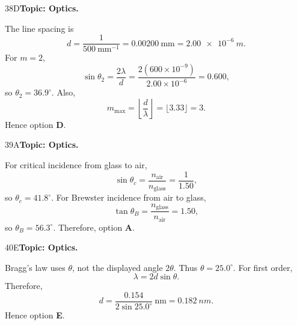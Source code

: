 \documentclass[10pt,a4paper]{physicsquiz}
\begin{document}
\begin{workedsolution}{38}{D}\textbf{Topic: Optics.}\par The line spacing is
  \[
    d=\frac{1}{500\ \mathrm{mm}^{-1}}=0.00200\ \mathrm{mm}=\SI{2.00e-6}{m}.
  \]
  For \(m=2\),
  \[
    \sin\theta_2=\frac{2\lambda}{d}
    =\frac{2(600\times10^{-9})}{2.00\times10^{-6}}=0.600,
  \]
  so \(\theta_2=36.9^\circ\). Also,
  \[
    m_{\max}=\left\lfloor\frac{d}{\lambda}\right\rfloor
    =\lfloor3.33\rfloor=3.
  \]
  Hence option \textbf{D}.\end{workedsolution}
\begin{workedsolution}{39}{A}\textbf{Topic: Optics.}\par For critical incidence from glass to air,
  \[
    \sin\theta_c=\frac{n_{\text{air}}}{n_{\text{glass}}}=\frac{1}{1.50},
  \]
  so \(\theta_c=41.8^\circ\). For Brewster incidence from air to glass,
  \[
    \tan\theta_B=\frac{n_{\text{glass}}}{n_{\text{air}}}=1.50,
  \]
  so \(\theta_B=56.3^\circ\). Therefore, option \textbf{A}.\end{workedsolution}
\begin{workedsolution}{40}{E}\textbf{Topic: Optics.}\par Bragg's law uses \(\theta\), not the displayed angle \(2\theta\). Thus \(\theta=25.0^\circ\). For first order,
  \[
    \lambda=2d\sin\theta.
  \]
  Therefore,
  \[
    d=\frac{0.154}{2\sin25.0^\circ}\ \mathrm{nm}
    =\SI{0.182}{nm}.
  \]
  Hence option \textbf{E}.\end{workedsolution}
\end{document}
